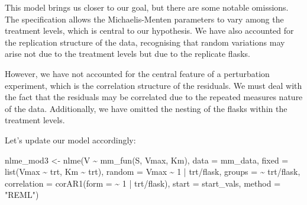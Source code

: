 \documentclass[
  letterpaper,
]{book}
\newenvironment{Shaded}{\begin{snugshade}}{\end{snugshade}}
\newcommand{\AttributeTok}[1]{\textcolor[rgb]{0.40,0.45,0.13}{#1}}
\newcommand{\DecValTok}[1]{\textcolor[rgb]{0.68,0.00,0.00}{#1}}
\newcommand{\FunctionTok}[1]{\textcolor[rgb]{0.28,0.35,0.67}{#1}}
\newcommand{\NormalTok}[1]{\textcolor[rgb]{0.00,0.23,0.31}{#1}}
\newcommand{\OtherTok}[1]{\textcolor[rgb]{0.00,0.23,0.31}{#1}}
\newcommand{\SpecialCharTok}[1]{\textcolor[rgb]{0.37,0.37,0.37}{#1}}
\newcommand{\StringTok}[1]{\textcolor[rgb]{0.13,0.47,0.30}{#1}}
\newcommand*\circled[1]{\tikz[baseline=(char.base)]{
          \node[shape=circle,draw,inner sep=1pt] (char) {{\scriptsize#1}};}}
\begin{document}
This model brings us closer to our goal, but there are some notable
omissions. The specification allows the Michaelis-Menten parameters to
vary among the treatment levels, which is central to our hypothesis. We
have also accounted for the replication structure of the data,
recognising that random variations may arise not due to the treatment
levels but due to the replicate flasks.

However, we have not accounted for the central feature of a perturbation
experiment, which is the correlation structure of the residuals. We must
deal with the fact that the residuals may be correlated due to the
repeated measures nature of the data. Additionally, we have omitted the
nesting of the flasks within the treatment levels.

Let's update our model accordingly:

\label{annotated-cell-72}%
\begin{Shaded}
\begin{Highlighting}[]
\NormalTok{nlme\_mod3 }\OtherTok{\textless{}{-}} \FunctionTok{nlme}\NormalTok{(V }\SpecialCharTok{\textasciitilde{}} \FunctionTok{mm\_fun}\NormalTok{(S, Vmax, Km),}
                  \AttributeTok{data =}\NormalTok{ mm\_data,}
                  \AttributeTok{fixed =} \FunctionTok{list}\NormalTok{(Vmax }\SpecialCharTok{\textasciitilde{}}\NormalTok{ trt, Km }\SpecialCharTok{\textasciitilde{}}\NormalTok{ trt),}
                  \AttributeTok{random =}\NormalTok{ Vmax }\SpecialCharTok{\textasciitilde{}} \DecValTok{1} \SpecialCharTok{|}\NormalTok{ trt}\SpecialCharTok{/}\NormalTok{flask, }\hspace*{\fill}\NormalTok{\circled{1}}
                  \AttributeTok{groups =} \SpecialCharTok{\textasciitilde{}}\NormalTok{ trt}\SpecialCharTok{/}\NormalTok{flask, }\hspace*{\fill}\NormalTok{\circled{2}}
                  \AttributeTok{correlation =} \FunctionTok{corAR1}\NormalTok{(}\AttributeTok{form =} \SpecialCharTok{\textasciitilde{}} \DecValTok{1} \SpecialCharTok{|}\NormalTok{ trt}\SpecialCharTok{/}\NormalTok{flask), }\hspace*{\fill}\NormalTok{\circled{3}}
                  \AttributeTok{start =}\NormalTok{ start\_vals,}
                  \AttributeTok{method =} \StringTok{"REML"}\NormalTok{)}
\end{Highlighting}
\end{Shaded}
\end{document}
